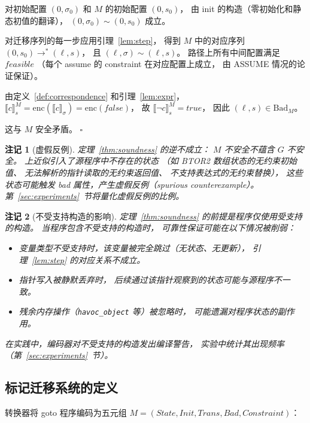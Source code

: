 \documentclass[11pt,a4paper]{article}
\newtheorem{remark}{注记}[section]
\newcommand{\State}{\mathit{State}}
\newcommand{\Init}{\mathit{Init}}
\newcommand{\Trans}{\mathit{Trans}}
\newcommand{\Bad}{\mathit{Bad}}
\newcommand{\Cons}{\mathit{Constraint}}
\begin{document}
对初始配置 $(0, \sigma_0)$ 和 $M$ 的初始配置 $(0, s_0)$，
由 init 的构造（零初始化和静态初值的翻译），
$(0, \sigma_0) \sim (0, s_0)$ 成立。

对迁移序列的每一步应用引理~\ref{lem:step}，
得到 $M$ 中的对应序列
$(0, s_0) \to^* (\ell, s)$，
且 $(\ell, \sigma) \sim (\ell, s)$。
路径上所有中间配置满足 $\mathit{feasible}$
（每个 assume 的 constraint 在对应配置上成立，
由 ASSUME 情况的论证保证）。

由定义~\ref{def:correspondence} 和引理~\ref{lem:expr}，
$\llbracket c \rrbracket^M_s = \mathrm{enc}(\llbracket c \rrbracket_\sigma) = \mathrm{enc}(\mathit{false})$，
故 $\llbracket \neg c \rrbracket^M_s = \mathit{true}$，
因此 $(\ell, s) \in \mathrm{Bad}_M$。

这与 $M$ 安全矛盾。 \hfill $\square$

\begin{remark}[虚假反例]
\label{rem:spurious}
定理~\ref{thm:soundness} 的逆\emph{不}成立：
$M$ 不安全\emph{不}蕴含 $G$ 不安全。
上近似引入了源程序中不存在的状态
（如 BTOR2 数组状态的无约束初始值、
无法解析的指针读取的无约束返回值、
不支持表达式的无约束替换），
这些状态可能触发 bad 属性，产生\emph{虚假反例}（spurious counterexample）。
第~\ref{sec:experiments}~节将量化虚假反例的比例。
\end{remark}

\begin{remark}[不受支持构造的影响]
\label{rem:unsupported}
定理~\ref{thm:soundness} 的前提是程序仅使用受支持的构造。
当程序包含不受支持的构造时，
可靠性保证可能在以下情况被削弱：
\begin{itemize}
\item 变量类型不受支持时，该变量被完全跳过（无状态、无更新），
  引理~\ref{lem:step} 的对应关系不成立。
\item 指针写入被静默丢弃时，
  后续通过该指针观察到的状态可能与源程序不一致。
\item 残余内存操作（\texttt{havoc\_object} 等）被忽略时，
  可能遗漏对程序状态的副作用。
\end{itemize}
在实践中，编码器对不受支持的构造发出编译警告，
实验中统计其出现频率（第~\ref{sec:experiments}~节）。
\end{remark}


\subsection{标记迁移系统的定义}

转换器将 goto 程序编码为五元组 $M = (\State, \Init, \Trans, \Bad, \Cons)$：
\end{document}
